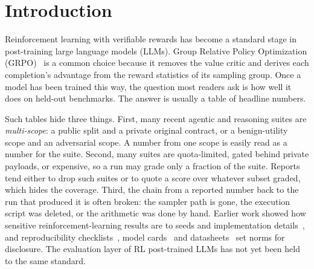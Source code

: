 \documentclass[runningheads]{llncs}
\begin{document}
\section{Introduction}

Reinforcement learning with verifiable rewards has become a standard stage in
post-training large language models (LLMs). Group Relative Policy Optimization
(GRPO)~\cite{shao2024deepseekmath,guo2025deepseekr1} is a common choice because
it removes the value critic and derives each completion's advantage from the
reward statistics of its sampling group. Once a model has been trained this way,
the question most readers ask is how well it does on held-out benchmarks. The
answer is usually a table of headline numbers.

Such tables hide three things. First, many recent agentic and reasoning suites
are \emph{multi-scope}: a public split and a private original contract, or a
benign-utility scope and an adversarial scope. A number from one scope is easily
read as a number for the suite. Second, many suites are quota-limited, gated
behind private payloads, or expensive, so a run may grade only a fraction of the
suite. Reports tend either to drop such suites or to quote a score over whatever
subset graded, which hides the coverage. Third, the chain from a reported number
back to the run that produced it is often broken: the sampler path is gone, the
execution script was deleted, or the arithmetic was done by hand. Earlier work
showed how sensitive reinforcement-learning results are to seeds and
implementation details~\cite{henderson2018deep}, and reproducibility
checklists~\cite{pineau2020improving}, model cards~\cite{mitchell2019modelcards}
and datasheets~\cite{gebru2021datasheets} set norms for disclosure. The
evaluation layer of RL post-trained LLMs has not yet been held to the same
standard.
\end{document}

